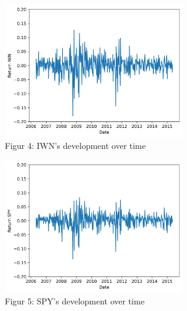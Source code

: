 \documentclass{rapport}
\begin{document}
\begin{figure}[H]
    \centering
    \includegraphics[width=0.7\textwidth]{figure_IWN_development.png}
    \caption{Figur 4: IWN's development over time}
    \label{fig:iwn_development}
\end{figure}

\begin{figure}[H]
    \centering
    \includegraphics[width=0.7\textwidth]{figure_SPY_development.png}
    \caption{Figur 5: SPY's development over time}
    \label{fig:spy_development}
\end{figure}

\end{document}
